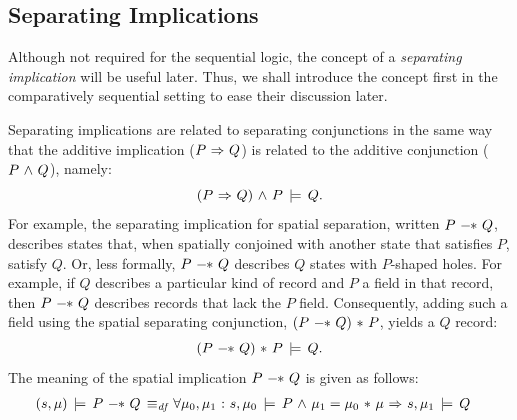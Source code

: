 \documentclass[11pt]{report}
\begin{document}
\subsection{Separating Implications}
\label{sec:seq-sep-imp}

Although not required for the sequential logic, the concept of a \emph{separating implication} will be useful later. Thus, we shall introduce the concept first in the comparatively sequential setting to ease their discussion later.

Separating implications are related to separating conjunctions in the same way that the additive implication ($P \operatorname{\,\Rightarrow\,} Q$) is related to the additive conjunction ($P \operatorname{\,\wedge\,} Q$), namely: \[ (P \operatorname{\,\Rightarrow\,} Q) \operatorname{\,\wedge\,} P \,\models\, Q.\] For example, the separating implication for spatial separation, written $P \fsepi Q$, describes states that, when spatially conjoined with another state that satisfies $P$, satisfy $Q$. Or, less formally, $P \fsepi Q$ describes $Q$ states with $P$-shaped holes. For example, if $Q$ describes a particular kind of record and $P$ a field in that record, then $P \fsepi Q$ describes records that lack the $P$ field. Consequently, adding such a field using the spatial separating conjunction, $(P \fsepi Q) \fsep P$, yields a $Q$ record: \[ (P \fsepi Q) \fsep P \sentails Q.\] The meaning of the spatial implication $P \fsepi Q$ is given as follows: \begin{align*} (s,\mu) \sentails P \fsepi Q \iffdef & \forall \mu_0,\mu_1 \st s,\mu_0 \sentails P \conj \mu_1 = \mu_0 \fsep \mu \onlyif  s,\mu_1 \sentails Q \end{align*} 
\end{document}
